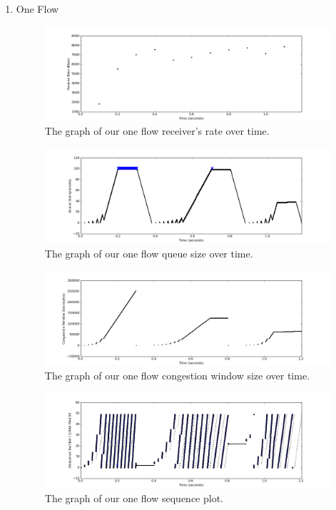 \documentclass[11pt]{article}
\begin{document}
\begin{enumerate}
  \item One Flow
  
\begin{figure}[H]
\caption{The graph of our one flow receiver's rate over time.}
	\label{figure1}
  	\centering
  	\includegraphics[width=\linewidth]{1f_rate.png}
\end{figure}

\begin{figure}[H]
\caption{The graph of our one flow queue size over time.}
  \label{figure2}
    \centering
    \includegraphics[width=\linewidth]{1f_queue.png}
\end{figure}

\begin{figure}[H]
\caption{The graph of our one flow congestion window size over time.}
  \label{figure3}
    \centering
    \includegraphics[width=\linewidth]{1f_window.png}
\end{figure}

\begin{figure}[H]
\caption{The graph of our one flow sequence plot.}
  \label{figure4}
    \centering
    \includegraphics[width=\linewidth]{1f_seq.png}
\end{figure}


\end{enumerate}
\end{document}
